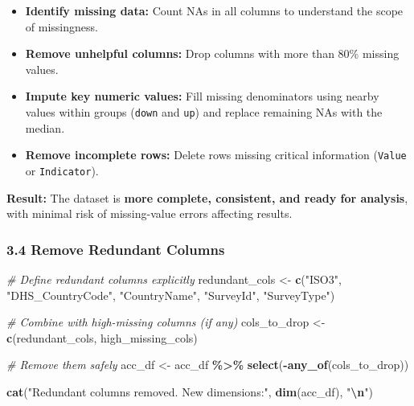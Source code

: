 \documentclass[
]{article}
\newenvironment{Shaded}{\begin{snugshade}}{\end{snugshade}}
\newcommand{\CommentTok}[1]{\textcolor[rgb]{0.56,0.35,0.01}{\textit{#1}}}
\newcommand{\FunctionTok}[1]{\textcolor[rgb]{0.13,0.29,0.53}{\textbf{#1}}}
\newcommand{\NormalTok}[1]{#1}
\newcommand{\OtherTok}[1]{\textcolor[rgb]{0.56,0.35,0.01}{#1}}
\newcommand{\SpecialCharTok}[1]{\textcolor[rgb]{0.81,0.36,0.00}{\textbf{#1}}}
\newcommand{\StringTok}[1]{\textcolor[rgb]{0.31,0.60,0.02}{#1}}
\providecommand{\tightlist}{%
  \setlength{\itemsep}{0pt}\setlength{\parskip}{0pt}}
\begin{document}
\begin{itemize}
\tightlist
\item
  \textbf{Identify missing data:} Count NAs in all columns to understand
  the scope of missingness.
\item
  \textbf{Remove unhelpful columns:} Drop columns with more than 80\%
  missing values.
\item
  \textbf{Impute key numeric values:} Fill missing denominators using
  nearby values within groups (\texttt{down} and \texttt{up}) and
  replace remaining NAs with the median.
\item
  \textbf{Remove incomplete rows:} Delete rows missing critical
  information (\texttt{Value} or \texttt{Indicator}).
\end{itemize}

\textbf{Result:} The dataset is \textbf{more complete, consistent, and
ready for analysis}, with minimal risk of missing-value errors affecting
results.

\subsubsection{3.4 Remove Redundant
Columns}\label{remove-redundant-columns}

\begin{Shaded}
\begin{Highlighting}[]
\CommentTok{\# Define redundant columns explicitly}
\NormalTok{redundant\_cols }\OtherTok{\textless{}{-}} \FunctionTok{c}\NormalTok{(}\StringTok{"ISO3"}\NormalTok{, }\StringTok{"DHS\_CountryCode"}\NormalTok{, }\StringTok{"CountryName"}\NormalTok{, }
                    \StringTok{"SurveyId"}\NormalTok{, }\StringTok{"SurveyType"}\NormalTok{)}

\CommentTok{\# Combine with high{-}missing columns (if any)}
\NormalTok{cols\_to\_drop }\OtherTok{\textless{}{-}} \FunctionTok{c}\NormalTok{(redundant\_cols, high\_missing\_cols)}

\CommentTok{\# Remove them safely}
\NormalTok{acc\_df }\OtherTok{\textless{}{-}}\NormalTok{ acc\_df }\SpecialCharTok{\%\textgreater{}\%}
  \FunctionTok{select}\NormalTok{(}\SpecialCharTok{{-}}\FunctionTok{any\_of}\NormalTok{(cols\_to\_drop))}

\FunctionTok{cat}\NormalTok{(}\StringTok{"Redundant columns removed. New dimensions:"}\NormalTok{, }\FunctionTok{dim}\NormalTok{(acc\_df), }\StringTok{"}\SpecialCharTok{\textbackslash{}n}\StringTok{"}\NormalTok{)}
\end{Highlighting}
\end{Shaded}
\end{document}
